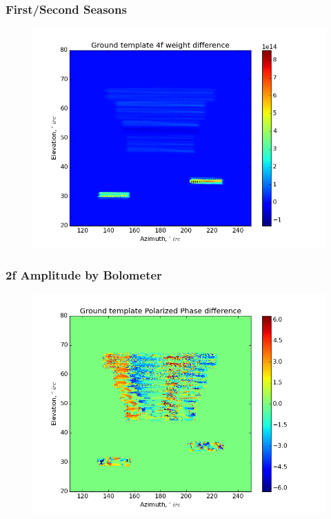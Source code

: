 \documentclass{beamer}
\begin{document}
\begin{frame}
\frametitle{First/Second Seasons}
\begin{figure}
\includegraphics[width=0.9\linewidth]{dw4_gt_FIRST_SECOND.png}
\end{figure}
\end{frame}

\begin{frame}
\frametitle{2f Amplitude by Bolometer}
\begin{figure}
\includegraphics[width=0.9\linewidth]{dArg_gt_AMP_2F_BY_BOLO.png}
\end{figure}
\end{frame}
\end{document}
